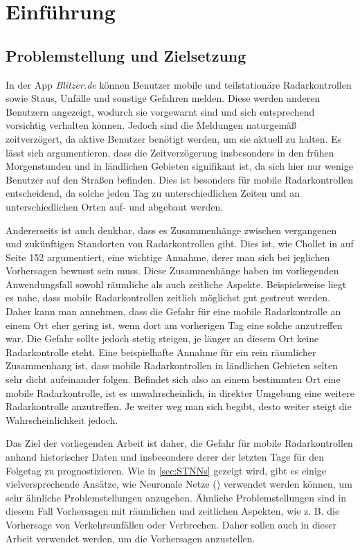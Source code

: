 \section{Einführung}
\label{sec:Einführung}

\subsection{Problemstellung und Zielsetzung}
\label{sec:Problemstellung}
In der App \emph{Blitzer.de} können Benutzer mobile und teilstationäre Radarkontrollen sowie Staus, Unfälle und sonstige Gefahren melden.
Diese werden anderen Benutzern angezeigt, wodurch sie vorgewarnt sind und sich entsprechend vorsichtig verhalten können.
Jedoch sind die Meldungen naturgemäß zeitverzögert, da aktive Benutzer benötigt werden, um sie aktuell zu halten.
Es lässt sich argumentieren, dass die Zeitverzögerung insbesonders in den frühen Morgenstunden und in ländlichen Gebieten signifikant ist,
da sich hier nur wenige Benutzer auf den Straßen befinden.
Dies ist besonders für mobile Radarkontrollen entscheidend, da solche jeden Tag zu unterschiedlichen Zeiten und an unterschiedlichen Orten auf- und abgebaut werden.

Andererseits ist auch denkbar, dass es Zusammenhänge zwischen vergangenen und zukünftigen Standorten von Radarkontrollen gibt.
Dies ist, wie Chollet in \cite{DeepLearningPythonKeras} auf Seite 152 argumentiert, eine wichtige Annahme, derer man sich bei jeglichen Vorhersagen bewusst sein muss.
Diese Zusammenhänge haben im vorliegenden Anwendungsfall sowohl räumliche als auch zeitliche Aspekte.
Beispielsweise liegt es nahe, dass mobile Radarkontrollen zeitlich möglichst gut gestreut werden.
Daher kann man annehmen, dass die Gefahr für eine mobile Radarkontrolle an einem Ort eher gering ist, wenn dort am vorherigen Tag eine solche anzutreffen war.
Die Gefahr sollte jedoch stetig steigen, je länger an diesem Ort keine Radarkontrolle steht.
Eine beispielhafte Annahme für ein rein räumlicher Zusammenhang ist, dass mobile Radarkontrollen in ländlichen Gebieten selten sehr dicht aufeinander folgen.
Befindet sich also an einem bestimmten Ort eine mobile Radarkontrolle, ist es unwahrscheinlich, in direkter Umgebung eine weitere Radarkontrolle anzutreffen.
Je weiter weg man sich begibt, desto weiter steigt die Wahrscheinlichkeit jedoch.

Das Ziel der vorliegenden Arbeit ist daher, die Gefahr für mobile Radarkontrollen anhand historischer Daten und insbesondere derer der letzten Tage für den Folgetag zu prognostizieren.
Wie in \autoref{sec:STNNs} gezeigt wird, gibt es einige vielversprechende Ansätze, wie Neuronale Netze () verwendet werden können, um sehr ähnliche Problemstellungen anzugehen.
Ähnliche Problemstellungen sind in diesem Fall Vorhersagen mit räumlichen und zeitlichen Aspekten, wie z. B. die Vorhersage von Verkehrsunfällen oder Verbrechen.
Daher sollen auch in dieser Arbeit  verwendet werden, um die Vorhersagen anzustellen.

